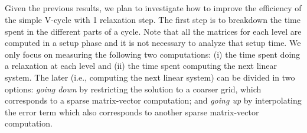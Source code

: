 \subsection{}

Given the previous results, we plan to investigate how to improve the
efficiency of the simple V-cycle with 1 relaxation step. The first step is to
breakdown the time spent in the different parts of a cycle. Note that all the
matrices for each level are computed in a setup phase and it is not necessary
to analyze that setup time. We only focus on measuring the following two
computations: (i) the time spent doing a relaxation at each level and (ii) the
time spent computing the next linear system. The later (i.e., computing the
next linear system) can be divided in two options: \emph{going down} by
restricting the solution to a coarser grid, which corresponds to a sparse
matrix-vector computation; and \emph{going up} by interpolating the error term
which also corresponds to another sparse matrix-vector computation.

\begin{table}[htb]
 \caption{Time breakdown of a V-cycle with $\alpha=1$.}
 \label{table.measures}
\end{table}

